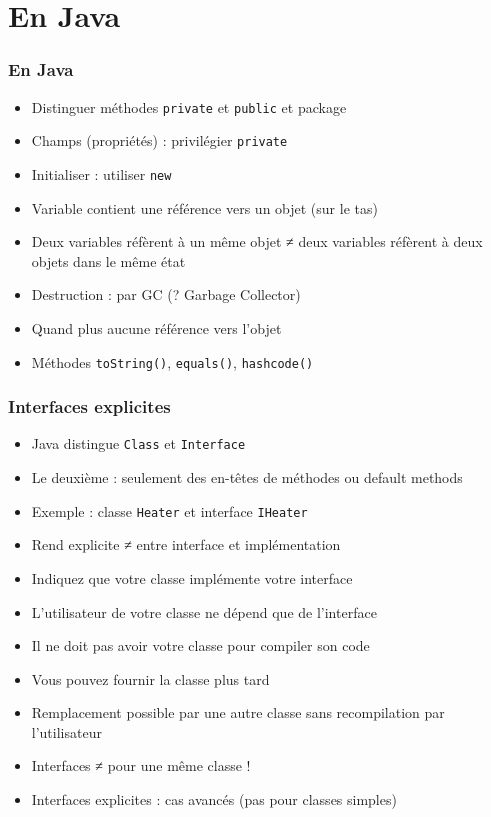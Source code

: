 \documentclass[english, french]{beamer}
\begin{document}
\section{En Java}
\begin{frame}
	\frametitle{En Java}
	\begin{itemize}
		\item Distinguer méthodes \texttt{private} et \texttt{public} {\tiny et package}
		\item Champs (propriétés) : privilégier \texttt{private}
		\item Initialiser : utiliser \texttt{new}
		\item Variable contient une référence vers un objet (sur le tas)
		\item Deux variables réfèrent à un même objet ≠ deux variables réfèrent à deux objets dans le même état
		\item Destruction : par GC (? \pause Garbage Collector)
		\item Quand plus aucune référence vers l’objet
		\item Méthodes \texttt{toString()}, \texttt{equals()}, \texttt{hashcode()}
	\end{itemize}
\end{frame}

\begin{frame}
	\frametitle{Interfaces explicites}
	\begin{itemize}
		\item Java distingue \texttt{Class} et \texttt{Interface}
		\item Le deuxième : seulement des en-têtes de méthodes {\tiny ou default methods}
		\item Exemple : classe \texttt{Heater} et interface \texttt{IHeater}
		\item Rend explicite ≠ entre interface et implémentation
		\item Indiquez que votre classe implémente votre interface
		\item L’utilisateur de votre classe ne dépend que de l’interface
		\item Il ne doit pas avoir votre classe pour compiler son code
		\item Vous pouvez fournir la classe plus tard
		\item Remplacement possible par une autre classe sans recompilation par l’utilisateur
		\item Interfaces ≠ pour une même classe !
		\item Interfaces explicites : cas avancés (pas pour classes simples)
	\end{itemize}
\end{frame}
\end{document}
